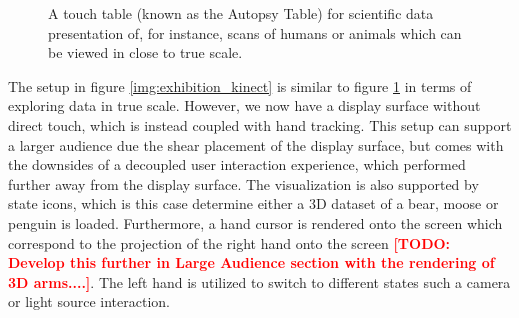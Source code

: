 \documentclass[review,journal]{vgtc}         %
\newcommand{\todo}[1]{\textbf{\textcolor{red}{[TODO: {#1}]}}}
\begin{document}
\begin{figure}[htb]
	\centering
	\caption{A touch table (known as the Autopsy Table) for scientific data presentation of, for instance, scans of humans or animals which can be viewed in close to true scale.}
	\label{img:exhibition_table}
\end{figure}

The setup in figure \ref{img:exhibition_kinect} is similar to figure \ref{img:exhibition_table} in terms of exploring data in true scale. However, we now have a display surface without direct touch, which is instead coupled with hand tracking. This setup can support a larger audience due the shear placement of the display surface, but comes with the downsides of a decoupled user interaction experience, which performed further away from the display surface. The visualization is also supported by state icons, which is this case determine either a 3D dataset of a bear, moose or penguin is loaded. Furthermore, a hand cursor is rendered onto the screen which correspond to the projection of the right hand onto the screen \todo{Develop this further in Large Audience section with the rendering of 3D arms....}. The left hand is utilized to switch to different states such a camera or light source interaction.
\end{document}

